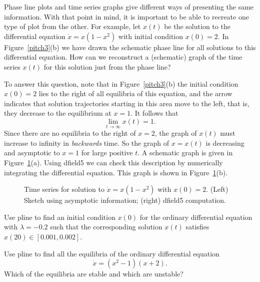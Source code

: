\documentclass{ximera}
\begin{document}
Phase line plots and time series graphs give different ways of
presenting the same information.  With that point in mind, it is
important to be able to recreate one type of plot from
the other.  For example, let $x(t)$ be the solution to the
differential equation $\dot{x}=x(1-x^2)$ with initial condition $x(0)=2$.
In Figure~\ref{pitch3}(b) we have drawn the schematic phase line for
all solutions to this differential equation. How can we reconstruct
a (schematic) graph of the time series $x(t)$ for this solution just
from the phase line?

To answer this question, note that in Figure~\ref{pitch3}(b) the
initial condition $x(0)=2$ lies to the right of all equilibria of
this equation, and the arrow indicates that solution trajectories
starting in this area move to the left, that is, they decrease to
the equilibrium at $x=1$.  It follows that
\[
\lim_{t\to\infty} x(t) = 1.
\]
Since there are no equilibria to the right of $x=2$, the graph of $x(t)$
must increase to infinity in {\em backwards\/} time.  So the graph of 
$x=x(t)$ is decreasing and asymptotic to $x=1$ for large positive $t$.  
A schematic graph is given in Figure~\ref{pitch3a}(a).  Using {\sf dfield5} 
we can check this description by numerically integrating the differential
equation.   This graph is shown in Figure~\ref{pitch3a}(b).

\begin{figure}[htb]
       \centerline{%
	}
       \caption{Time series for solution to $\dot{x}=x(1-x^2)$ with $x(0)=2$.
	(Left) Sketch using asymptotic information; (right) {\sf dfield5}
	computation.}
       \label{pitch3a}
\end{figure}



\EXER

\CEXER

\begin{exercise} \label{c3.3.1}
Use {\sf pline} to find an initial condition $x(0)$ for the
ordinary differential equation  with $\lambda=-0.2$
such that the corresponding solution $x(t)$ satisfies
$x(20)\in[0.001,0.002]$.
\end{exercise}

\begin{exercise} \label{c3.3.2}
Use {\sf pline} to find all the equilibria of the ordinary
differential equation
\[
\dot{x} = (x^2-1)(x+2).
\]
Which of the equilibria are stable and which are unstable?
\end{exercise}
\end{document}
